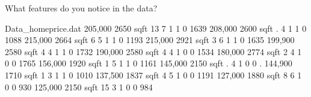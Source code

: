\begin{frame}[fragile]
\emp
\blankcolumn
{}
\oyo What features do you notice in the data?
\emp
\vskip5pt
\hspace*{-0.3in}
\begin{scriptcraw}{.0}{Data\_homeprice.dat}
205,000    2650 sqft   13      7       1       1       0       1639
208,000    2600 sqft   .      4       1       1       0       1088
215,000    2664 sqft   6      5       1       1       0       1193
215,000    2921 sqft   3      6       1       1       0       1635
199,900    2580 sqft   4      4       1       1       0       1732
190,000    2580 sqft   4      4       1       0       0       1534
180,000    2774 sqft   2      4       1       0       0       1765
156,000    1920 sqft   1      5       1       1       0       1161
145,000    2150 sqft   .      4       1       0       0          .
144,900    1710 sqft   1      3       1       1       0       1010
137,500    1837 sqft   4      5       1       0       0       1191
127,000    1880 sqft   8      6       1       0       0        930
125,000    2150 sqft   15      3       1       0       0        984
\end{scriptcraw}
\emp
\end{frame}


